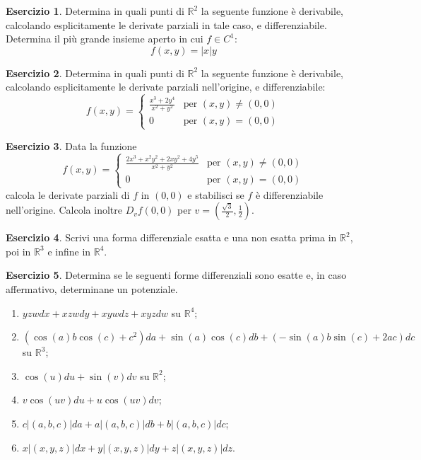 \documentclass[12pt,a4paper]{article}
\theoremstyle{definition}
\newtheorem{exe}{Esercizio}
\begin{document}
\begin{exe}
    Determina in quali punti di $\mathbb{R}^2$ la seguente funzione è derivabile, calcolando esplicitamente le derivate parziali in tale caso, e differenziabile. Determina il più grande insieme aperto in cui $f \in C^1$:
    \[
        f(x,y) = |x|y
    \]
\end{exe}

\begin{exe}
    Determina in quali punti di $\mathbb{R}^2$ la seguente funzione è derivabile, calcolando esplicitamente le derivate parziali nell'origine, e differenziabile:
    \[
        f(x,y) = \begin{cases}
            \frac{x^3+2y^4}{x^2+y^2} & \text{per } (x,y) \neq (0,0) \\
            0                        & \text{per } (x,y) = (0,0)
        \end{cases}
    \]
\end{exe}

\begin{exe}
    Data la funzione
    \[
        f(x,y) = \begin{cases}
            \frac{2x^3+x^2y^2+2xy^2+4y^5}{x^2+y^2} & \text{per } (x,y) \neq (0,0) \\
            0                                      & \text{per } (x,y) = (0,0)
        \end{cases}
    \]
    calcola le derivate parziali di $f$ in $(0,0)$ e stabilisci se $f$ è differenziabile nell'origine. Calcola inoltre $D_v f(0,0)$ per $v = \left(\frac{\sqrt{3}}{2}, \frac{1}{2}\right)$.
\end{exe}

\begin{exe}
    Scrivi una forma differenziale esatta e una non esatta prima in $\mathbb{R}^2$, poi in $\mathbb{R}^3$ e infine in $\mathbb{R}^4$.
\end{exe}

\begin{exe}
    Determina se le seguenti forme differenziali sono esatte e, in caso affermativo, determinane un potenziale.
    \begin{enumerate}
        \item $yzw dx + xzw dy + xyw dz + xyz dw$ su $\mathbb{R}^4$;
        \item $(\cos(a)b \cos(c) + c^2) da + \sin(a) \cos(c) db + (-\sin(a)b \sin(c) + 2ac) dc$ su $\mathbb{R}^3$;
        \item $\cos(u) du + \sin(v) dv$ su $\mathbb{R}^2$;
        \item $v \cos(uv) du + u \cos(uv) dv$;
        \item $c |(a,b,c)| da + a |(a,b,c)| db + b |(a,b,c)| dc$;
        \item $x |(x,y,z)| dx + y |(x,y,z)| dy + z |(x,y,z)| dz$.
    \end{enumerate}
\end{exe}
\end{document}
